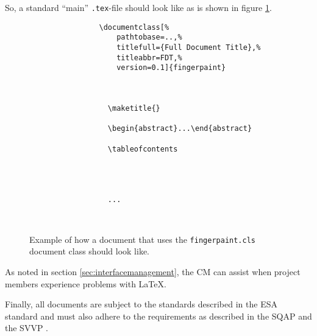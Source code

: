 So, a standard ``main'' \texttt{.tex}-file should look like as is shown in figure \ref{fig:exampledocument}.

\begin{figure}
	\begin{center}
		\begin{minipage}{0.8\textwidth}
			\begin{verbatim}
				\documentclass[%
				    pathtobase=..,%
				    titlefull={Full Document Title},%
				    titleabbr=FDT,%
				    version=0.1]{fingerpaint}

				

				  \maketitle{}

				  \begin{abstract}...\end{abstract}

				  \tableofcontents

				  
				  
				  
				  ...

				
			\end{verbatim}
			\caption{Example of how a document that uses the \texttt{fingerpaint.cls} document class should look like.}
			\label{fig:exampledocument}
		\end{minipage}
	\end{center}
\end{figure}

As noted in section \ref{sec:interfacemanagement}, the CM can assist when project members experience problems with \LaTeX{}.

Finally, all documents are subject to the standards described in the ESA standard \cite{esa} and must also adhere to the requirements as described in the SQAP \cite{sqap} and the SVVP \cite{svvp}.